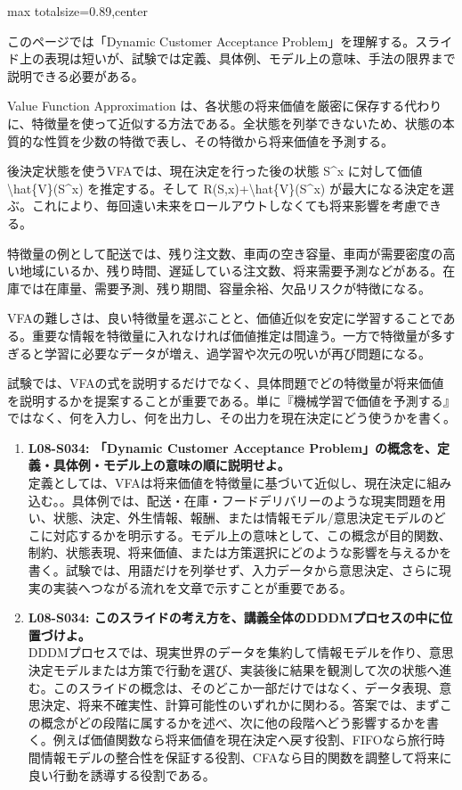 \begin{minipage}[t]{0.58\textwidth}
\begin{adjustbox}{max totalsize={\textwidth}{0.89\textheight},center}
\begin{minipage}{\textwidth}\scriptsize
{}このページでは「Dynamic Customer Acceptance Problem」を理解する。スライド上の表現は短いが、試験では定義、具体例、モデル上の意味、手法の限界まで説明できる必要がある。\par
Value Function Approximation は、各状態の将来価値を厳密に保存する代わりに、特徴量を使って近似する方法である。全状態を列挙できないため、状態の本質的な性質を少数の特徴で表し、その特徴から将来価値を予測する。\par
後決定状態を使うVFAでは、現在決定を行った後の状態 S\textasciicircum{}x に対して価値 \textbackslash{}hat\{V\}(S\textasciicircum{}x) を推定する。そして R(S,x)+\textbackslash{}hat\{V\}(S\textasciicircum{}x) が最大になる決定を選ぶ。これにより、毎回遠い未来をロールアウトしなくても将来影響を考慮できる。\par
特徴量の例として配送では、残り注文数、車両の空き容量、車両が需要密度の高い地域にいるか、残り時間、遅延している注文数、将来需要予測などがある。在庫では在庫量、需要予測、残り期間、容量余裕、欠品リスクが特徴になる。\par
VFAの難しさは、良い特徴量を選ぶことと、価値近似を安定に学習することである。重要な情報を特徴量に入れなければ価値推定は間違う。一方で特徴量が多すぎると学習に必要なデータが増え、過学習や次元の呪いが再び問題になる。\par
試験では、VFAの式を説明するだけでなく、具体問題でどの特徴量が将来価値を説明するかを提案することが重要である。単に『機械学習で価値を予測する』ではなく、何を入力し、何を出力し、その出力を現在決定にどう使うかを書く。\par{}\begin{enumerate}\item \textbf{L08-S034: 「Dynamic Customer Acceptance Problem」の概念を、定義・具体例・モデル上の意味の順に説明せよ。}\\定義としては、VFAは将来価値を特徴量に基づいて近似し、現在決定に組み込む。。具体例では、配送・在庫・フードデリバリーのような現実問題を用い、状態、決定、外生情報、報酬、または情報モデル/意思決定モデルのどこに対応するかを明示する。モデル上の意味として、この概念が目的関数、制約、状態表現、将来価値、または方策選択にどのような影響を与えるかを書く。試験では、用語だけを列挙せず、入力データから意思決定、さらに現実の実装へつながる流れを文章で示すことが重要である。\item \textbf{L08-S034: このスライドの考え方を、講義全体のDDDMプロセスの中に位置づけよ。}\\DDDMプロセスでは、現実世界のデータを集約して情報モデルを作り、意思決定モデルまたは方策で行動を選び、実装後に結果を観測して次の状態へ進む。このスライドの概念は、そのどこか一部だけではなく、データ表現、意思決定、将来不確実性、計算可能性のいずれかに関わる。答案では、まずこの概念がどの段階に属するかを述べ、次に他の段階へどう影響するかを書く。例えば価値関数なら将来価値を現在決定へ戻す役割、FIFOなら旅行時間情報モデルの整合性を保証する役割、CFAなら目的関数を調整して将来に良い行動を誘導する役割である。\end{enumerate}

\end{minipage}
\end{adjustbox}
\end{minipage}

